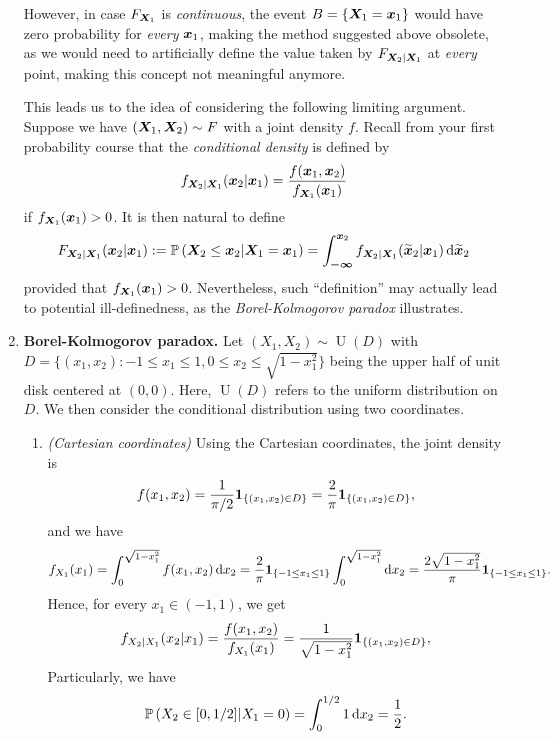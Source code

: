 \begin{enumerate}
However, in case \(F_{\bm{X}_1}\) is \emph{continuous}, the event
\(B=\{\bm{X}_1=\bm{x}_1\}\) would have zero probability for \emph{every}
\(\bm{x}_1\), making the method suggested above obsolete, as we would need to
artificially define the value taken by \(F_{\bm{X}_2|\bm{X}_1}\) at
\emph{every} point, making this concept not meaningful anymore.

This leads us to the idea of considering the following limiting argument.
Suppose we have \((\bm{X}_1,\bm{X}_2)\sim F\) with a joint density \(f\).
Recall from your first probability course that the \emph{conditional density}
is defined by
\[
f_{\bm{X}_2|\bm{X}_1}(\bm{x}_2|\bm{x}_1)
=\frac{f(\bm{x}_1,\bm{x}_2)}{f_{\bm{X}_1}(\bm{x}_1)}
\]
if \(f_{\bm{X}_1}(\bm{x}_1)>0\). It is then natural to define
\[
F_{\vect{X}_2|\vect{X}_1}(\vect{x}_2|\vect{x}_1)
:=\prob{\vect{X}_2\le\vect{x}_2|\vect{X}_1=\vect{x}_1}
=\int_{\vect{-\infty}}^{\vect{x}_2}
f_{\vect{X}_2|\vect{X}_1}(\widetilde{\vect{x}}_2|\vect{x}_1)
\odif{\widetilde{\vect{x}}_2}
\]
provided that \(f_{\bm{X}_1}(\bm{x}_1)>0\). Nevertheless, such
``definition'' may actually lead to potential ill-definedness, as the
\emph{Borel-Kolmogorov paradox} illustrates.
\item \textbf{Borel-Kolmogorov paradox.} Let
\((X_1,X_2)\sim\operatorname{U}(D)\) with \(D=\{(x_1,x_2):-1\le x_1\le 1, 0\le
x_2\le \sqrt{1-x_{1}^{2}}\}\) being the upper half of unit disk centered at
\((0,0)\). Here, \(\operatorname{U}(D)\) refers to the uniform distribution
on \(D\). We then consider the conditional distribution using two coordinates.

\begin{enumerate}
\item \emph{(Cartesian coordinates)} Using the Cartesian coordinates, the joint
density is \[f(x_1,x_2)=\frac{1}{\pi/2}\mathbf{1}_{\left\{(x_1,x_2)\in D\right\}}
=\frac{2}{\pi}\mathbf{1}_{\left\{(x_1,x_2)\in D\right\}},\] and we have
\[f_{X_1}(x_1)
=\int_{0}^{\sqrt{1-x_{1}^{2}}}f(x_1,x_2)\odif{x_2}
=\frac{2}{\pi}\indicset{-1\le x_1\le 1}\int_{0}^{\sqrt{1-x_{1}^{2}}}\odif{x_2}
=\frac{2\sqrt{1-x_{1}^{2}}}{\pi}\indicset{-1\le x_1\le 1}.
\]
Hence, for every \(x_1\in (-1,1)\), we get
\[
f_{X_2|X_1}(x_2|x_1)=\frac{f(x_1,x_2)}{f_{X_1}(x_1)}
=\frac{1}{\sqrt{1-x_{1}^{2}}}\mathbf{1}_{\left\{(x_1,x_2)\in D\right\}},
\]
Particularly, we have
\[\prob{X_2\in [0,1/2]|X_1=0}=\int_{0}^{1/2}1\odif{x_2}=\frac{1}{2}.\]


\end{enumerate}
\end{enumerate}
